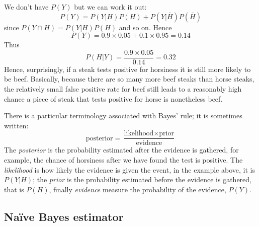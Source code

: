 \documentclass[11pt,a4paper]{scrartcl}
\begin{document}
We don't have $P(Y)$ but we can work it out:
\begin{equation}
P(Y)=P(Y|H)P(H)+P(Y|\bar{H})P(\bar{H})
\end{equation}
since $P(Y\cap H)=P(Y|H)P(H)$ and so on. Hence
\begin{equation}
P(Y)=0.9\times 0.05 + 0.1\times 0.95=0.14
\end{equation}
Thus
\begin{equation}
P(H|Y)=\frac{0.9\times 0.05}{0.14}=0.32
\end{equation}
Hence, surprisingly, if a steak tests positive for horsiness it is
still more likely to be beef. Basically, because there are so many
more beef steaks than horse steaks, the relatively small false
positive rate for beef still leads to a reasonably high chance a piece
of steak that tests positive for horse is nonetheless beef.

There is a particular terminology associated with Bayes' rule; it is
sometimes written:
\begin{equation}
\mbox{posterior}=\frac{\mbox{likelihood}\times \mbox{prior}}{\mbox{evidence}}
\end{equation}
The \textsl{posterior} is the probability estimated after the evidence
is gathered, for example, the chance of horsiness after we have found
the test is positive.  The \textsl{likelihood} is how likely the
evidence is given the event, in the example above, it is $P(Y|H)$; the
\textsl{prior} is the probability estimated before the evidence is
gathered, that is $P(H)$, finally \textsl{evidence} measure the
probability of the evidence, $P(Y)$.

\subsection*{Na\"ive Bayes estimator}
\end{document}
